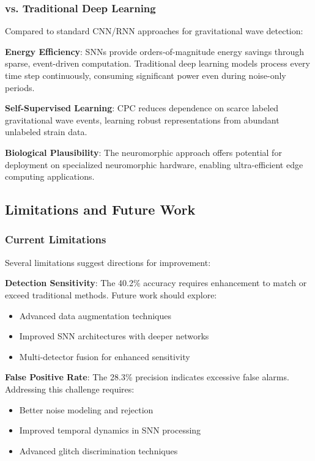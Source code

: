 \documentclass[12pt,a4paper]{article}
\begin{document}
\subsubsection{vs. Traditional Deep Learning}

Compared to standard CNN/RNN approaches for gravitational wave detection:

\textbf{Energy Efficiency}: SNNs provide orders-of-magnitude energy savings through sparse, event-driven computation. Traditional deep learning models process every time step continuously, consuming significant power even during noise-only periods.

\textbf{Self-Supervised Learning}: CPC reduces dependence on scarce labeled gravitational wave events, learning robust representations from abundant unlabeled strain data.

\textbf{Biological Plausibility}: The neuromorphic approach offers potential for deployment on specialized neuromorphic hardware, enabling ultra-efficient edge computing applications.

\subsection{Limitations and Future Work}

\subsubsection{Current Limitations}

Several limitations suggest directions for improvement:

\textbf{Detection Sensitivity}: The 40.2\% accuracy requires enhancement to match or exceed traditional methods. Future work should explore:
\begin{itemize}
\item Advanced data augmentation techniques
\item Improved SNN architectures with deeper networks
\item Multi-detector fusion for enhanced sensitivity
\end{itemize}

\textbf{False Positive Rate}: The 28.3\% precision indicates excessive false alarms. Addressing this challenge requires:
\begin{itemize}
\item Better noise modeling and rejection
\item Improved temporal dynamics in SNN processing
\item Advanced glitch discrimination techniques
\end{itemize}
\end{document}
